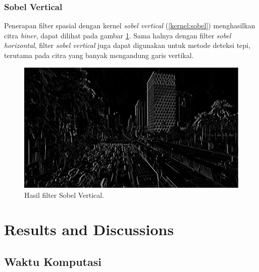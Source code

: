 \subsubsection{Sobel Vertical}
Penerapan filter spasial dengan kernel \textit{sobel vertical} (\ref{kernel:sobel}) menghasilkan citra \textit{biner}, dapat dilihat pada gambar \ref{fig:output-sobelver}. Sama halnya dengan filter \textit{sobel horizontal}, filter \textit{sobel vertical} juga dapat digunakan untuk metode deteksi tepi, terutama pada citra yang banyak mengandung garis vertikal.
\begin{figure}
    \includegraphics[width=0.8\linewidth, center]{images/output-image/input1-sobelver.png}
    \caption{Hasil filter Sobel Vertical.}
    \label{fig:output-sobelver}
\end{figure}




\section{Results and Discussions}

\subsection{Waktu Komputasi}

